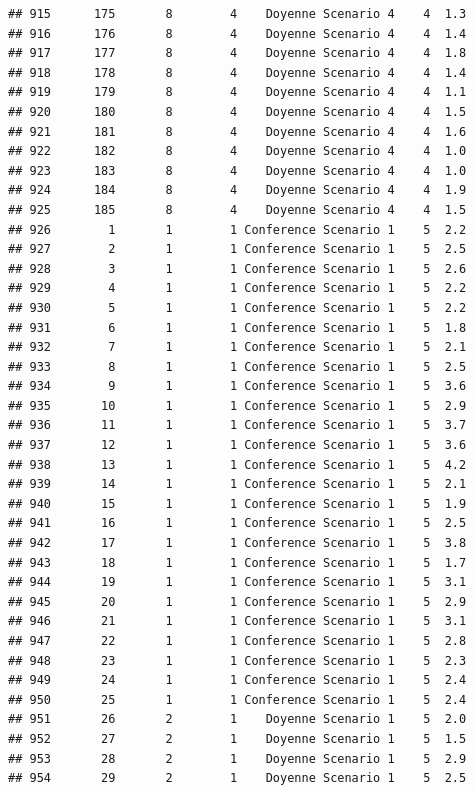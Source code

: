\documentclass[
]{article}
\begin{document}
\begin{verbatim}
## 915      175       8        4    Doyenne Scenario 4    4  1.3
## 916      176       8        4    Doyenne Scenario 4    4  1.4
## 917      177       8        4    Doyenne Scenario 4    4  1.8
## 918      178       8        4    Doyenne Scenario 4    4  1.4
## 919      179       8        4    Doyenne Scenario 4    4  1.1
## 920      180       8        4    Doyenne Scenario 4    4  1.5
## 921      181       8        4    Doyenne Scenario 4    4  1.6
## 922      182       8        4    Doyenne Scenario 4    4  1.0
## 923      183       8        4    Doyenne Scenario 4    4  1.0
## 924      184       8        4    Doyenne Scenario 4    4  1.9
## 925      185       8        4    Doyenne Scenario 4    4  1.5
## 926        1       1        1 Conference Scenario 1    5  2.2
## 927        2       1        1 Conference Scenario 1    5  2.5
## 928        3       1        1 Conference Scenario 1    5  2.6
## 929        4       1        1 Conference Scenario 1    5  2.2
## 930        5       1        1 Conference Scenario 1    5  2.2
## 931        6       1        1 Conference Scenario 1    5  1.8
## 932        7       1        1 Conference Scenario 1    5  2.1
## 933        8       1        1 Conference Scenario 1    5  2.5
## 934        9       1        1 Conference Scenario 1    5  3.6
## 935       10       1        1 Conference Scenario 1    5  2.9
## 936       11       1        1 Conference Scenario 1    5  3.7
## 937       12       1        1 Conference Scenario 1    5  3.6
## 938       13       1        1 Conference Scenario 1    5  4.2
## 939       14       1        1 Conference Scenario 1    5  2.1
## 940       15       1        1 Conference Scenario 1    5  1.9
## 941       16       1        1 Conference Scenario 1    5  2.5
## 942       17       1        1 Conference Scenario 1    5  3.8
## 943       18       1        1 Conference Scenario 1    5  1.7
## 944       19       1        1 Conference Scenario 1    5  3.1
## 945       20       1        1 Conference Scenario 1    5  2.9
## 946       21       1        1 Conference Scenario 1    5  3.1
## 947       22       1        1 Conference Scenario 1    5  2.8
## 948       23       1        1 Conference Scenario 1    5  2.3
## 949       24       1        1 Conference Scenario 1    5  2.4
## 950       25       1        1 Conference Scenario 1    5  2.4
## 951       26       2        1    Doyenne Scenario 1    5  2.0
## 952       27       2        1    Doyenne Scenario 1    5  1.5
## 953       28       2        1    Doyenne Scenario 1    5  2.9
## 954       29       2        1    Doyenne Scenario 1    5  2.5

\end{verbatim}
\end{document}
